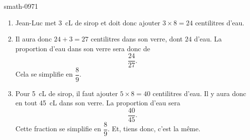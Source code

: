 
\begin{corrige}{smath-0971}

    \begin{enumerate}
        \item
            Jean-Luc met \SI{3}{\centi\liter} de sirop et doit donc ajouter \( 3\times 8=24\) centilitres d'eau.
        \item
            Il aura donc \( 24+3=27\) centilitres dans son verre, dont \( 24\) d'eau. La proportion d'eau dans son verre sera donc de
            \begin{equation}
                \frac{ 24 }{ 27 }.
            \end{equation}
            Cela se simplifie en \( \dfrac{ 8 }{ 9 }\).
        \item
            Pour \SI{5}{\centi\liter} de sirop, il faut ajouter \( 5\times 8=40\) centilitres d'eau. Il y aura donc en tout \SI{45}{\centi\liter} dans son verre. La proportion d'eau sera
            \begin{equation}
                \frac{ 40 }{ 45 }.
            \end{equation}
            Cette fraction se simplifie en \( \dfrac{ 8 }{ 9 }\). Et, tiens donc, c'est la même.
    \end{enumerate}

\end{corrige}

